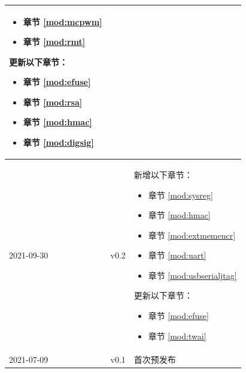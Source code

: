 \begin{longtable}[l]{ | m{2cm} | m{1.5cm} | m{12cm} | }
\begin{itemize}
            \item 章节 \ref{mod:mcpwm} \textit{\nameref{mod:mcpwm}}
            \item 章节 \ref{mod:rmt} \textit{\nameref{mod:rmt}}
        \end{itemize}
    更新以下章节：
        \begin{itemize}
            \item 章节 \ref{mod:efuse} \textit{\nameref{mod:efuse}}
            \item 章节 \ref{mod:rsa} \textit{\nameref{mod:rsa}}
            \item 章节 \ref{mod:hmac} \textit{\nameref{mod:hmac}}
            \item 章节 \ref{mod:digsig} \textit{\nameref{mod:digsig}}
        \end{itemize}
    \\\hline
    2021-09-30      & v0.2 &
        新增以下章节：
            \begin{itemize}
                \item 章节 \ref{mod:sysreg} \textit{\nameref{mod:sysreg}}
                \item 章节 \ref{mod:hmac} \textit{\nameref{mod:hmac}}
                \item 章节 \ref{mod:extmemencr} \textit{\nameref{mod:extmemencr}}
                \item 章节 \ref{mod:uart} \textit{\nameref{mod:uart}}
                \item 章节 \ref{mod:usbserialjtag} \textit{\nameref{mod:usbserialjtag}}
            \end{itemize}

    更新以下章节：
            \begin{itemize}
                \item 章节 \ref{mod:efuse} \textit{\nameref{mod:efuse}}
                \item 章节 \ref{mod:twai} \textit{\nameref{mod:twai}}
            \end{itemize}
            \\\hline
    2021-07-09 & v0.1 & 首次预发布\\\hline

\end{longtable}
